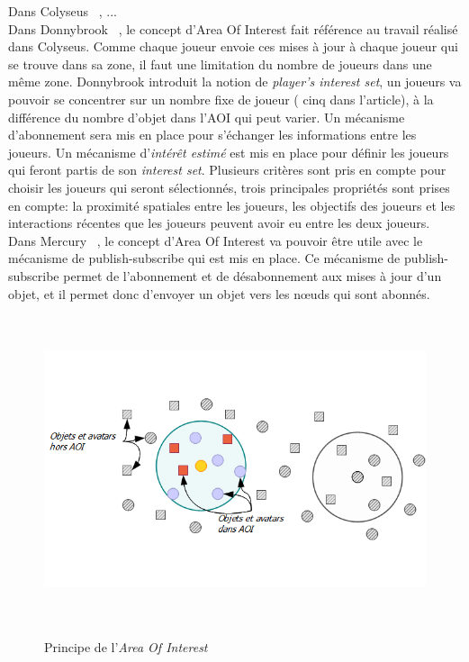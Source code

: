 	Dans Colyseus ~\cite{1267692}, ... \\
	Dans Donnybrook ~\cite{1403002}, le concept d'Area Of Interest fait référence au travail réalisé dans Colyseus. Comme chaque joueur envoie ces mises à jour à chaque joueur qui se trouve dans sa zone, il faut une limitation du nombre de joueurs dans une même zone. Donnybrook introduit la notion de \textit{player's interest set}, un joueurs va pouvoir se concentrer sur un nombre fixe de joueur ( cinq dans l'article), à la différence du nombre d'objet dans l'AOI qui peut varier. Un mécanisme d'abonnement sera mis en place pour s'échanger les informations entre les joueurs. Un mécanisme d'\textit{intérêt estimé} est mis en place pour définir les joueurs qui feront partis de son \textit{interest set}. Plusieurs critères sont pris en compte pour choisir les joueurs qui seront sélectionnés, trois principales propriétés sont prises en compte: la proximité spatiales entre les joueurs, les objectifs des joueurs et les interactions récentes que les joueurs peuvent avoir eu entre les deux joueurs.\\
	Dans Mercury ~\cite{1015507}, le concept d'Area Of Interest va pouvoir être utile avec le mécanisme de publish-subscribe qui est mis en place. Ce mécanisme de publish-subscribe permet de l'abonnement et de désabonnement aux mises à jour d'un objet, et il permet donc d'envoyer un objet vers les nœuds qui sont abonnés.\\
	\vspace{1cm}
        \begin{figure}[!h]
        \centering
        \includegraphics[width=16cm,height=9cm]{../Images/AOI.png}\\
        \caption{Principe de l'\textit{Area Of Interest}}
        \label{AOI}
        \end{figure}
	\vspace{1cm}
\newpage
